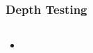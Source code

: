 \begin{frame}
\frametitle{Depth Testing}
\begin{columns}




\begin{itemize}
\item
\end{itemize}




\end{columns}
\end{frame}
